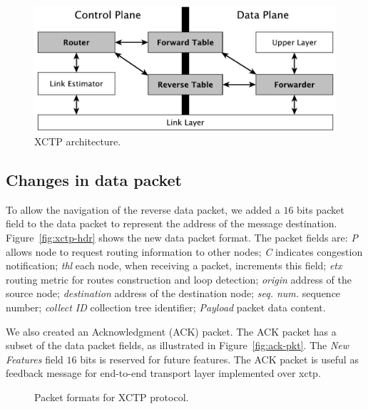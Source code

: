 \begin{figure}[t]
\centerline{
    \includegraphics[width=0.8\linewidth]{img/architecture}
} \caption{XCTP architecture.} \label{fig:architecture}
\end{figure}

\subsection{Changes in data packet}
\label{sec:changes-in-data-packet}

To allow the navigation of the reverse data packet, we added a $16$ bits packet field to the data packet to represent the address of the message destination. Figure~\ref{fig:xctp-hdr} shows the new data packet format. The packet fields are: \textit{P} allows node to request routing information to other nodes; \textit{C} indicates congestion notification; \textit{\ac{thl}} each node, when receiving a packet, increments this field; \textit{\acs{etx}} routing metric for routes construction and loop detection; \textit{origin} address of the source node; \textit{destination} address of the destination node; \textit{seq. num.} sequence number; \textit{collect ID} collection tree identifier; \textit{Payload} packet data content.

We also created an Acknowledgment (ACK) packet. The ACK packet has a subset of the data packet fields, as illustrated in Figure~\ref{fig:ack-pkt}. The \textit{New Features} field $16$ bits is reserved for future features. The ACK packet is useful as feedback message for end-to-end transport layer implemented over \ac{xctp}.

\begin{figure}[!ht]
\center
 \caption{Packet formats for XCTP protocol.} \label{fig:pacotes}
\end{figure}


